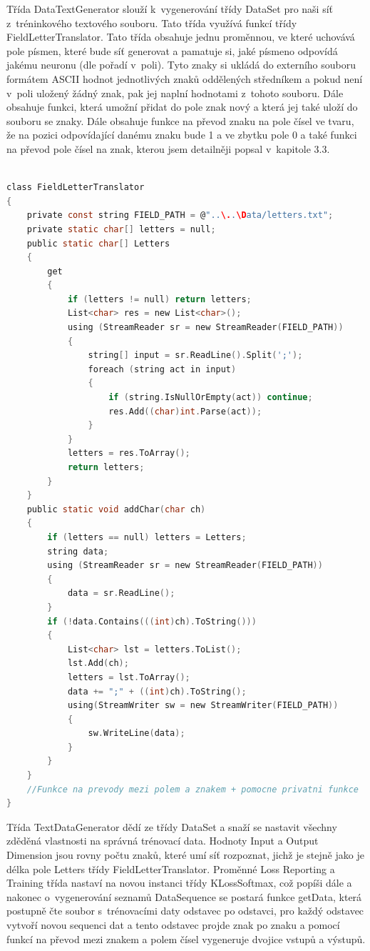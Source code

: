 \documentclass[a4paper]{article}
\begin{document}
Třída DataTextGenerator slouží k~vygenerování třídy DataSet pro naši síť z~tréninkového textového souboru. Tato třída využívá funkcí třídy FieldLetterTranslator. Tato třída obsahuje jednu proměnnou, ve které uchovává pole písmen, které bude síť generovat a pamatuje si, jaké písmeno odpovídá jakému neuronu (dle pořadí v~poli). Tyto znaky si ukládá do externího souboru formátem ASCII hodnot jednotlivých znaků oddělených středníkem a pokud není v~poli uložený žádný znak, pak jej naplní hodnotami z~tohoto souboru. Dále obsahuje funkci, která umožní přidat do pole znak nový a která jej také uloží do souboru se znaky. Dále obsahuje funkce na převod znaku na pole čísel ve tvaru, že na pozici odpovídající danému znaku bude 1 a ve zbytku pole 0 a také funkci na převod pole čísel na znak, kterou jsem detailněji popsal v~kapitole 3.3. 
\begin{lstlisting}[language=c, title={Ukázka části třídy FieldLetterTranslator}]

class FieldLetterTranslator
{
    private const string FIELD_PATH = @"..\..\Data/letters.txt";
    private static char[] letters = null;
    public static char[] Letters
    {
        get
        {
            if (letters != null) return letters;
            List<char> res = new List<char>();
            using (StreamReader sr = new StreamReader(FIELD_PATH))
            {
                string[] input = sr.ReadLine().Split(';');
                foreach (string act in input)
                {
                    if (string.IsNullOrEmpty(act)) continue;
                    res.Add((char)int.Parse(act));
                }
            }
            letters = res.ToArray();
            return letters;
        }
    }
    public static void addChar(char ch)
    {
        if (letters == null) letters = Letters;
        string data;
        using (StreamReader sr = new StreamReader(FIELD_PATH))
        {
            data = sr.ReadLine();
        }
        if (!data.Contains(((int)ch).ToString()))
        {
            List<char> lst = letters.ToList();
            lst.Add(ch);
            letters = lst.ToArray();
            data += ";" + ((int)ch).ToString();
            using(StreamWriter sw = new StreamWriter(FIELD_PATH))
            {
                sw.WriteLine(data);
            }
        }
    }
    //Funkce na prevody mezi polem a znakem + pomocne privatni funkce
}
\end{lstlisting}
Třída TextDataGenerator dědí ze třídy DataSet a snaží se nastavit všechny zděděná vlastnosti na správná trénovací data. Hodnoty Input a Output Dimension jsou rovny počtu znaků, které umí síť rozpoznat, jichž je stejně jako je délka pole Letters třídy FieldLetterTranslator. Proměnné Loss Reporting a Training třída nastaví na novou instanci třídy KLossSoftmax, což popíši dále a nakonec o~vygenerování seznamů DataSequence se postará funkce getData, která postupně čte soubor s~trénovacími daty odstavec po odstavci, pro každý odstavec vytvoří novou sequenci dat a tento odstavec projde znak po znaku a pomocí funkcí na převod mezi znakem a polem čísel vygeneruje dvojice vstupů a výstupů.
\end{document}
